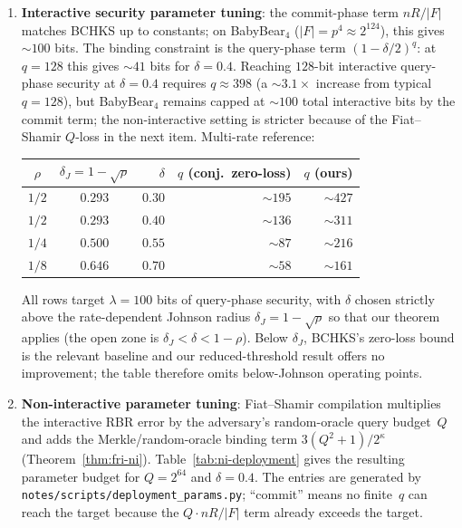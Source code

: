\documentclass[11pt]{article}
\begin{document}
\begin{enumerate}[nosep]
\item \textbf{Interactive security parameter tuning}: the commit-phase term $nR/|F|$ matches BCHKS up to constants; on BabyBear$_4$ ($|F| = p^4 \approx 2^{124}$), this gives ${\sim}100$ bits. The binding constraint is the query-phase term $(1{-}\delta/2)^q$: at $q = 128$ this gives ${\sim}41$ bits for $\delta=0.4$. Reaching $128$-bit interactive query-phase security at $\delta=0.4$ requires $q \approx 398$ (a ${\sim}3.1\times$ increase from typical $q=128$), but BabyBear$_4$ remains capped at ${\sim}100$ total interactive bits by the commit term; the non-interactive setting is stricter because of the Fiat--Shamir $Q$-loss in the next item. Multi-rate reference:
\begin{center}\small
\begin{tabular}{ccrrr}
\toprule
$\rho$ & $\delta_J = 1{-}\sqrt{\rho}$ & $\delta$ & $q$ (conj.\ zero-loss) & $q$ (ours) \\
\midrule
$1/2$ & $0.293$ & $0.30$ & ${\sim} 195$ & ${\sim} 427$ \\
$1/2$ & $0.293$ & $0.40$ & ${\sim} 136$ & ${\sim} 311$ \\
$1/4$ & $0.500$ & $0.55$ & ${\sim} 87$  & ${\sim} 216$ \\
$1/8$ & $0.646$ & $0.70$ & ${\sim} 58$  & ${\sim} 161$ \\
\bottomrule
\end{tabular}
\end{center}
All rows target $\lambda = 100$ bits of query-phase security, with $\delta$ chosen strictly above the rate-dependent Johnson radius $\delta_J = 1-\sqrt{\rho}$ so that our theorem applies (the open zone is $\delta_J < \delta < 1{-}\rho$). Below $\delta_J$, BCHKS's zero-loss bound is the relevant baseline and our reduced-threshold result offers no improvement; the table therefore omits below-Johnson operating points.
\item \textbf{Non-interactive parameter tuning}: Fiat--Shamir compilation multiplies the interactive RBR error by the adversary's random-oracle query budget~$Q$ and adds the Merkle/random-oracle binding term $3(Q^2{+}1)/2^\kappa$ (Theorem~\ref{thm:fri-ni}). Table~\ref{tab:ni-deployment} gives the resulting parameter budget for $Q=2^{64}$ and $\delta=0.4$. The entries are generated by \texttt{notes/scripts/deployment\_params.py}; ``commit'' means no finite~$q$ can reach the target because the $Q\cdot nR/|F|$ term already exceeds the target.


\end{enumerate}
\end{document}
